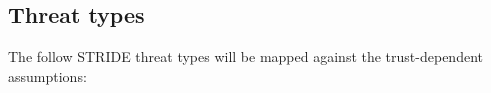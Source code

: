 \subsection{Threat types} 
The follow STRIDE threat types\cite{STRIDE} will be mapped against the trust-dependent assumptions:


